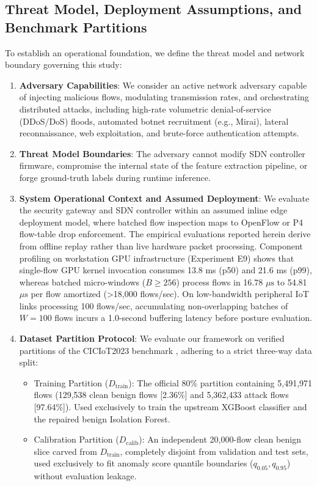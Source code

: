 \documentclass[journal,10pt,onecolumn]{IEEEtran}
\begin{document}
\subsection{Threat Model, Deployment Assumptions, and Benchmark Partitions}
To establish an operational foundation, we define the threat model and network boundary governing this study:
\begin{enumerate}
    \item \textbf{Adversary Capabilities}: We consider an active network adversary capable of injecting malicious flows, modulating transmission rates, and orchestrating distributed attacks, including high-rate volumetric denial-of-service (DDoS/DoS) floods, automated botnet recruitment (e.g., Mirai), lateral reconnaissance, web exploitation, and brute-force authentication attempts.
    \item \textbf{Threat Model Boundaries}: The adversary cannot modify SDN controller firmware, compromise the internal state of the feature extraction pipeline, or forge ground-truth labels during runtime inference.
    \item \textbf{System Operational Context and Assumed Deployment}: We evaluate the security gateway and SDN controller within an assumed inline edge deployment model, where batched flow inspection maps to OpenFlow or P4 flow-table drop enforcement. The empirical evaluations reported herein derive from offline replay rather than live hardware packet processing. Component profiling on workstation GPU infrastructure (Experiment E9) shows that single-flow GPU kernel invocation consumes 13.8 ms (p50) and 21.6 ms (p99), whereas batched micro-windows ($B \ge 256$) process flows in 16.78 $\mu\text{s}$ to 54.81 $\mu\text{s}$ per flow amortized (>18,000 flows/sec). On low-bandwidth peripheral IoT links processing 100 flows/sec, accumulating non-overlapping batches of $W = 100$ flows incurs a 1.0-second buffering latency before posture evaluation.
    \item \textbf{Dataset Partition Protocol}: We evaluate our framework on verified partitions of the CICIoT2023 benchmark \cite{3}, adhering to a strict three-way data split:
    \begin{itemize}
        \item Training Partition ($D_{\text{train}}$): The official 80\% partition containing 5,491,971 flows (129,538 clean benign flows [2.36\%] and 5,362,433 attack flows [97.64\%]). Used exclusively to train the upstream XGBoost classifier and the repaired benign Isolation Forest.
        \item Calibration Partition ($D_{\text{calib}}$): An independent 20,000-flow clean benign slice carved from $D_{\text{train}}$, completely disjoint from validation and test sets, used exclusively to fit anomaly score quantile boundaries ($q_{0.05}, q_{0.95}$) without evaluation leakage.

\end{itemize}
\end{enumerate}
\end{document}
